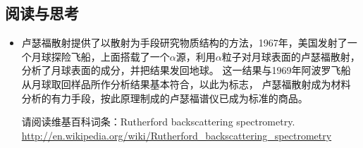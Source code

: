 \subsection*{阅读与思考}

\begin{itemize}

\item{卢瑟福散射提供了以散射为手段研究物质结构的方法，1967年，美国发射了一个月球探险飞船，上面搭载了一个$\alpha $源，利用$\alpha $粒子对月球表面的卢瑟福散射，分析了月球表面的成分，并把结果发回地球。
这一结果与1969年阿波罗飞船从月球取回样品所作分析结果基本符合，以此为标志，
卢瑟福散射成为材料分析的有力手段，按此原理制成的卢瑟福谱仪已成为标准的商品。

请阅读维基百科词条：Rutherford backscattering spectrometry. 
\url{http://en.wikipedia.org/wiki/Rutherford_backscattering_spectrometry}
}

\end{itemize}

